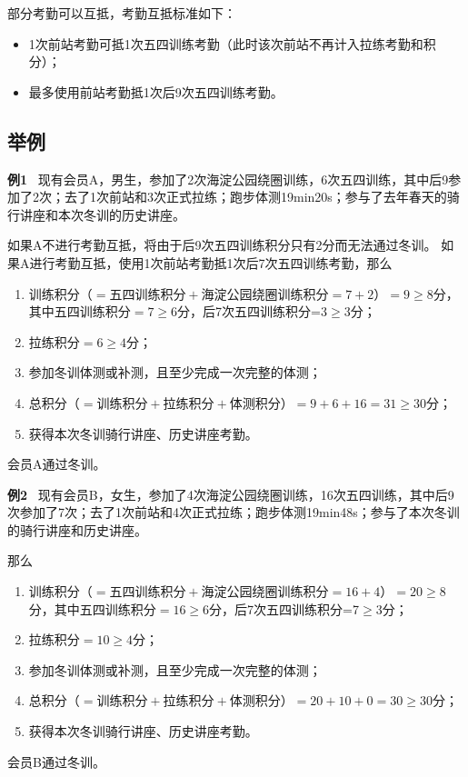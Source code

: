 \documentclass[UTF8]{ctexart}
\begin{document}
部分考勤可以互抵，考勤互抵标准如下：

\begin{itemize}[nosep,left=4em]
    \item 1次前站考勤可抵1次五四训练考勤（此时该次前站不再计入拉练考勤和积分）；
    \item 最多使用前站考勤抵1次后9次五四训练考勤。 
\end{itemize}

\subsection{举例}
\small{
    \textbf{例1} \ 现有会员A，男生，参加了2次海淀公园绕圈训练，6次五四训练，其中后9参加了2次；去了1次前站和3次正式拉练；跑步体测19min20s；参与了去年春天的骑行讲座和本次冬训的历史讲座。

如果A不进行考勤互抵，将由于后9次五四训练积分只有2分而无法通过冬训。
如果A进行考勤互抵，使用1次前站考勤抵1次后7次五四训练考勤，那么
\begin{enumerate}[nosep,left=4em]
    \item 训练积分（$=\text{五四训练积分}+\text{海淀公园绕圈训练积分}=7+2$）$=9\ge 8$分，其中五四训练积分$=7\ge 6$分，后7次五四训练积分=3$\ge 3$分；
    \item 拉练积分$=6\ge 4$分；
    \item 参加冬训体测或补测，且至少完成一次完整的体测；
    \item 总积分（$=\text{训练积分}+\text{拉练积分}+\text{体测积分}$）$=9+6+16=31\ge 30$分；
    \item 获得本次冬训骑行讲座、历史讲座考勤。
\end{enumerate}

会员A通过冬训。\\
}

\small{
    \textbf{例2} \ 现有会员B，女生，参加了4次海淀公园绕圈训练，16次五四训练，其中后9次参加了7次；去了1次前站和4次正式拉练；跑步体测19min48s；参与了本次冬训的骑行讲座和历史讲座。

那么
\begin{enumerate}[nosep,left=4em]
    \item 训练积分（$=\text{五四训练积分}+\text{海淀公园绕圈训练积分}=16+4$）$=20\ge 8$分，其中五四训练积分$=16\ge 6$分，后7次五四训练积分=7$\ge 3$分；
    \item 拉练积分$=10\ge 4$分；
    \item 参加冬训体测或补测，且至少完成一次完整的体测；
    \item 总积分（$=\text{训练积分}+\text{拉练积分}+\text{体测积分}$）$=20+10+0=30\ge 30$分；
    \item 获得本次冬训骑行讲座、历史讲座考勤。
\end{enumerate}

会员B通过冬训。

}
\end{document}
